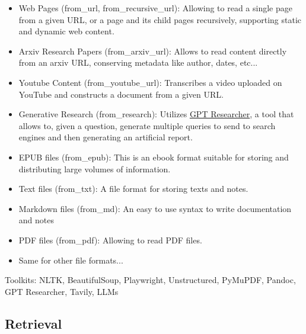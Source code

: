 \begin{itemize}
    \item Web Pages (from\_url, from\_recursive\_url): Allowing to read a single page from a given URL, or a page and its child pages recursively, supporting static and dynamic web content.
    \item Arxiv Research Papers (from\_arxiv\_url): Allows to read content directly from an arxiv URL, conserving metadata like author, dates, etc...
    \item Youtube Content (from\_youtube\_url): Transcribes a video uploaded on YouTube and constructs a document from a given URL.
    \item Generative Research (from\_research): Utilizes \href{https://gptr.dev/}{GPT Researcher}, a tool that allows to, given a question, generate multiple queries to send to search engines and then generating an artificial report.
    \item EPUB files (from\_epub): This is an e\-book format suitable for storing and distributing large volumes of information.
    \item Text files (from\_txt): A file format for storing texts and notes.
    \item Markdown files (from\_md): An easy to use syntax to write documentation and notes
    \item PDF files (from\_pdf): Allowing to read PDF files.
    \item Same for other file formats...
\end{itemize}
Toolkits: NLTK, BeautifulSoup, Playwright, Unstructured, PyMuPDF, Pandoc, GPT Researcher, Tavily, LLMs

\subsection{Retrieval}
